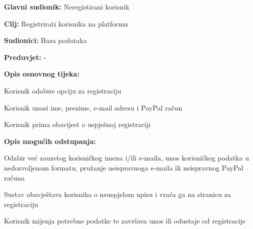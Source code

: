 					\noindent {}
					\begin{packed_item}
	
						\item \textbf{Glavni sudionik: } Neregistirani korisnik
						\item  \textbf{Cilj:}  Registrirati korisnika na platformu
						\item  \textbf{Sudionici:}  Baza podataka
						\item  \textbf{Preduvjet:}  -
						\item  \textbf{Opis osnovnog tijeka:}
						
						\item[] \begin{packed_enum}
	
							\item  Korisnik odabire opciju za registraciju
							\item  Korisnik unosi ime, prezime, e-mail adresu i PayPal račun
							\item  Korisnik prima obavijest o uspješnoj registraciji
						\end{packed_enum}
						
						\item  \textbf{Opis mogućih odstupanja:}
						
						\item[] \begin{packed_item}
	
							\item[2.a]  Odabir već zauzetog korisničkog imena i/ili e-maila, unos korisničkog 
							podatka u nedozvoljenom formatu, pružanje neispravnoga e-maila ili neispravnog PayPal računa
							\item[] \begin{packed_enum}
								
								\item  Sustav obavještava korisnika o neuspjelom upisu i 
								vraća ga na stranicu za registraciju
								\item  Korisnik mijenja potrebne podatke te završava unos ili
								odustaje od registracije
								
							\end{packed_enum}
							
						\end{packed_item}
					\end{packed_item}
						

